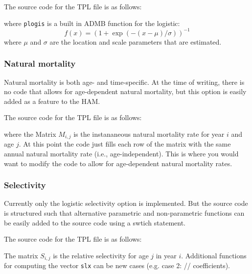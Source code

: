 \documentclass[12pt,letterpaper]{article}
\newcommand{\ham}{HAM}
\begin{document}
       The source code for the TPL file is as follows:
       \lstset{basicstyle=\footnotesize}
      
      where \texttt{plogis} is a built in ADMB function for the logistic: \[f(x) =  (1+\exp(-(x-\mu)/\sigma))^{-1} \] where $\mu$ and $\sigma$ are the location and scale parameters that are estimated.
    

    \subsubsection{Natural mortality} %
    \label{ssub:natural_mortality}
    
      Natural mortality is both age- and time-specific.  At the time of writing, there is no code that allows for age-dependent natural mortality, but this option is easily added as a feature to the \ham.

      The source code for the TPL file is as follows:
      
      where the Matrix $M_{i,j}$ is the instananeous natural mortality rate for year $i$ and age $j$.  At this point the code just fills each row of the matrix with the same annual natural mortality rate (i.e., age-independent).  This is where you would want to modify the code to allow for age-dependent natural mortality rates.

    \subsubsection{Selectivity} %
    \label{ssub:selectivity}
      Currently only the logistic selectivity option is implemented. But the source code is structured such that alternative parametric and non-parametric functions can be easily added to the source code using a swtich statement.

       The source code for the TPL file is as follows:
      

      The matrix $S_{i,j}$ is the relative selectivity for age $j$ in year $i$.  Additional functions for computing the vector \texttt{slx} can be new cases (e.g. case 2:  // coefficients).
\end{document}
